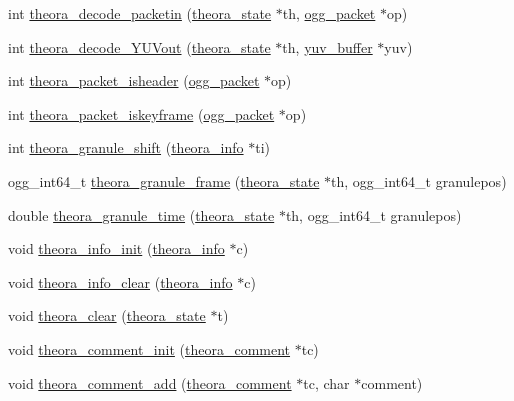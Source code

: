 \begin{DoxyCompactItemize}
\item 
int \hyperlink{group__oldfuncs_gaa65a9e53b46fd54ab344bd599fa96975}{theora\+\_\+decode\+\_\+packetin} (\hyperlink{structtheora__state}{theora\+\_\+state} $\ast$th, \hyperlink{structogg__packet}{ogg\+\_\+packet} $\ast$op)
\item 
int \hyperlink{group__oldfuncs_ga09d47c80e1e94bff0a46a496816b8daa}{theora\+\_\+decode\+\_\+\+Y\+U\+Vout} (\hyperlink{structtheora__state}{theora\+\_\+state} $\ast$th, \hyperlink{structyuv__buffer}{yuv\+\_\+buffer} $\ast$yuv)
\item 
int \hyperlink{group__oldfuncs_gab969f9d0407683f0e5abe73d0839a25b}{theora\+\_\+packet\+\_\+isheader} (\hyperlink{structogg__packet}{ogg\+\_\+packet} $\ast$op)
\item 
int \hyperlink{group__oldfuncs_ga39ccc8f847a748d7074c926b4fdd12b2}{theora\+\_\+packet\+\_\+iskeyframe} (\hyperlink{structogg__packet}{ogg\+\_\+packet} $\ast$op)
\item 
int \hyperlink{group__oldfuncs_gacd9360e6a47139c761002410af457a02}{theora\+\_\+granule\+\_\+shift} (\hyperlink{structtheora__info}{theora\+\_\+info} $\ast$ti)
\item 
ogg\+\_\+int64\+\_\+t \hyperlink{group__oldfuncs_ga7bfa3ceb2fb4b41a282456c56e1dd269}{theora\+\_\+granule\+\_\+frame} (\hyperlink{structtheora__state}{theora\+\_\+state} $\ast$th, ogg\+\_\+int64\+\_\+t granulepos)
\item 
double \hyperlink{group__oldfuncs_ga4376358b12b9fa23ce6fe21cb5c65ac6}{theora\+\_\+granule\+\_\+time} (\hyperlink{structtheora__state}{theora\+\_\+state} $\ast$th, ogg\+\_\+int64\+\_\+t granulepos)
\item 
void \hyperlink{group__oldfuncs_ga3091c87d48f1faba018c5956379a6d90}{theora\+\_\+info\+\_\+init} (\hyperlink{structtheora__info}{theora\+\_\+info} $\ast$c)
\item 
void \hyperlink{group__oldfuncs_gaba7022d58edbc4825cacad03f68b3e0d}{theora\+\_\+info\+\_\+clear} (\hyperlink{structtheora__info}{theora\+\_\+info} $\ast$c)
\item 
void \hyperlink{group__oldfuncs_gab252d5d81b925136dda72e8f1c09c5eb}{theora\+\_\+clear} (\hyperlink{structtheora__state}{theora\+\_\+state} $\ast$t)
\item 
void \hyperlink{group__oldfuncs_ga811b92785df3bdbbebb3de612d9d6ce0}{theora\+\_\+comment\+\_\+init} (\hyperlink{structtheora__comment}{theora\+\_\+comment} $\ast$tc)
\item 
void \hyperlink{group__oldfuncs_ga650642ed23894e41109bbc42ec393ed4}{theora\+\_\+comment\+\_\+add} (\hyperlink{structtheora__comment}{theora\+\_\+comment} $\ast$tc, char $\ast$comment)

\end{DoxyCompactItemize}
